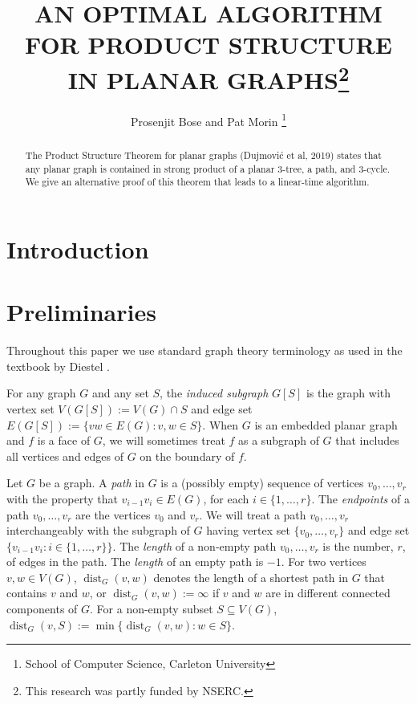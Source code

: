 \documentclass{patmorin}
\title{\MakeUppercase{An Optimal Algorithm for Product Structure in Planar Graphs}\thanks{This research was partly funded by NSERC.}}
\author{Prosenjit Bose and Pat Morin%
    \thanks{School of Computer Science, Carleton University}}
\date{}
\DeclareMathOperator{\dist}{dist}
\begin{document}
\maketitle

\begin{abstract}
    The Product Structure Theorem for planar graphs (Dujmović et al, 2019) states that any planar graph is contained in strong product of a planar $3$-tree, a path, and $3$-cycle.  We give an alternative proof of this theorem that leads to a linear-time algorithm.
\end{abstract}

%

\section{Introduction}

\section{Preliminaries}

Throughout this paper we use standard graph theory terminology as used in the textbook by Diestel \cite{diestel:graph}.

For any graph $G$ and any set $S$, the \emph{induced subgraph} $G[S]$ is the graph with vertex set $V(G[S]):=V(G)\cap S$ and edge set $E(G[S]):=\{vw\in E(G):v,w\in S\}$.  When $G$ is an embedded planar graph and $f$ is a face of $G$, we will sometimes treat $f$ as a subgraph of $G$ that includes all vertices and edges of $G$ on the boundary of $f$.

Let $G$ be a graph. A \emph{path} in $G$ is a (possibly empty) sequence of vertices $v_0,\ldots,v_r$ with the property that $v_{i-1}v_i\in E(G)$, for each $i\in\{1,\ldots,r\}$.  The \emph{endpoints} of a path $v_0,\ldots,v_r$ are the vertices $v_0$ and $v_r$.  We will treat a path $v_0,\ldots,v_r$ interchangeably with the subgraph of $G$ having vertex set $\{v_0,\ldots,v_r\}$ and edge set $\{v_{i-1}v_i:i\in\{1,\ldots,r\}\}$.  The \emph{length} of a non-empty path $v_0,\ldots,v_r$ is the number, $r$, of edges in the path.  The \emph{length} of an empty path is $-1$. For two vertices $v,w\in V(G)$, $\dist_G(v,w)$ denotes the length of a shortest path in $G$ that contains $v$ and $w$, or $\dist_G(v,w):=\infty$ if $v$ and $w$ are in different connected components of $G$.  For a non-empty subset $S\subseteq V(G)$, $\dist_G(v,S):=\min\{\dist_G(v,w):w\in S\}$.
\end{document}
